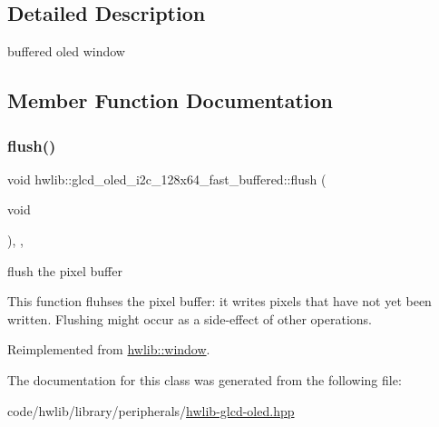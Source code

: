 \subsection{Detailed Description}
buffered oled window 

\subsection{Member Function Documentation}
\mbox{\label{classhwlib_1_1glcd__oled__i2c__128x64__fast__buffered_a799b9725f8b535d8fe22b18ffd98af8e}} 
\subsubsection{\texorpdfstring{flush()}{flush()}}
{\footnotesize\ttfamily void hwlib\+::glcd\+\_\+oled\+\_\+i2c\+\_\+128x64\+\_\+fast\+\_\+buffered\+::flush (\begin{DoxyParamCaption}\item[{void}]{ }\end{DoxyParamCaption})\hspace{0.3cm}{\ttfamily [inline]}, {\ttfamily [override]}, {\ttfamily [virtual]}}



flush the pixel buffer 

This function fluhses the pixel buffer\+: it writes pixels that have not yet been written. Flushing might occur as a side-\/effect of other operations. 

Reimplemented from \hyperlink{classhwlib_1_1window_a2b654a98872d174173e1df24a444c949}{hwlib\+::window}.



The documentation for this class was generated from the following file\+:\begin{DoxyCompactItemize}
\item 
code/hwlib/library/peripherals/\hyperlink{library_2peripherals_2hwlib-glcd-oled_8hpp}{hwlib-\/glcd-\/oled.\+hpp}\end{DoxyCompactItemize}
